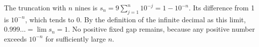 The truncation with $ n $ nines is $ s_n=9\sum_{j=1}^n10^{-j}=1-10^{-n}$. Its difference from 1 is $ 10^{-n}$, which tends to 0. By the definition of the infinite decimal as this limit, $ 0.999\ldots=\lim s_n=\boxed1 $. No positive fixed gap remains, because any positive number exceeds $ 10^{-n}$ for sufficiently large $ n $.
